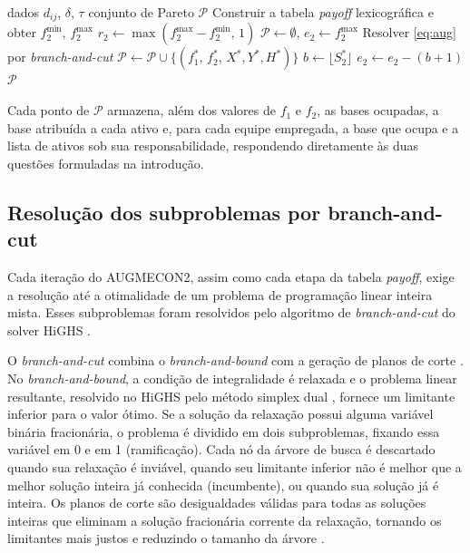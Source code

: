 \documentclass[conference]{IEEEtran}
\begin{document}
\begin{algorithm}[!t]
\caption{AUGMECON2 aplicado ao problema}
\label{alg:augmecon2}
\begin{algorithmic}[1]
\Require dados $d_{ij}$, $\delta$, $\tau$
\Ensure conjunto de Pareto $\mathcal{P}$
\State Construir a tabela \textit{payoff} lexicográfica e obter $f_2^{\min}$, $f_2^{\max}$
\State $r_2 \gets \max(f_2^{\max} - f_2^{\min},\, 1)$
\State $\mathcal{P} \gets \emptyset$, \quad $e_2 \gets f_2^{\max}$
  \State Resolver \eqref{eq:aug} por \textit{branch-and-cut}
    \State \Break
  \EndIf
  \State $\mathcal{P} \gets \mathcal{P} \cup \{(f_1^{*},\, f_2^{*},\, X^{*}, Y^{*}, H^{*})\}$
  \State $b \gets \lfloor S_2^{*} \rfloor$ 
  \State $e_2 \gets e_2 - (b + 1)$
\EndWhile
\State \Return $\mathcal{P}$
\end{algorithmic}
\end{algorithm}

Cada ponto de $\mathcal{P}$ armazena, além dos valores de $f_1$ e $f_2$, as bases ocupadas, a base atribuída a cada ativo e, para cada equipe empregada, a base que ocupa e a lista de ativos sob sua responsabilidade, respondendo diretamente às duas questões formuladas na introdução.

\subsection{Resolução dos subproblemas por branch-and-cut}
\label{sec:bc}

Cada iteração do AUGMECON2, assim como cada etapa da tabela \textit{payoff}, exige a resolução até a otimalidade de um problema de programação linear inteira mista. Esses subproblemas foram resolvidos pelo algoritmo de \textit{branch-and-cut} do solver HiGHS \cite{huangfu2018,highs}.

O \textit{branch-and-cut} combina o \textit{branch-and-bound} \cite{landdoig1960} com a geração de planos de corte \cite{padberg1991,wolsey1998}. No \textit{branch-and-bound}, a condição de integralidade é relaxada e o problema linear resultante, resolvido no HiGHS pelo método simplex dual \cite{huangfu2018}, fornece um limitante inferior para o valor ótimo. Se a solução da relaxação possui alguma variável binária fracionária, o problema é dividido em dois subproblemas, fixando essa variável em 0 e em 1 (ramificação). Cada nó da árvore de busca é descartado quando sua relaxação é inviável, quando seu limitante inferior não é melhor que a melhor solução inteira já conhecida (incumbente), ou quando sua solução já é inteira. Os planos de corte são desigualdades válidas para todas as soluções inteiras que eliminam a solução fracionária corrente da relaxação, tornando os limitantes mais justos e reduzindo o tamanho da árvore \cite{wolsey1998}.
\end{document}
